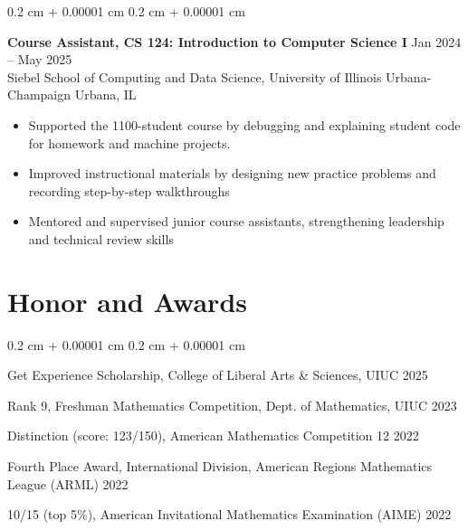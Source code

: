 \documentclass[10pt, letterpaper]{article}
\newenvironment{highlights}{
    \begin{itemize}[
        topsep=0 cm,
        parsep=0 cm,
        partopsep=0pt,
        itemsep=0pt,
        leftmargin=0.4 cm + 10pt
    ]
}{
    \end{itemize}
} %
\newenvironment{onecolentry}{
    \begin{adjustwidth}{
        0.2 cm + 0.00001 cm
    }{
        0.2 cm + 0.00001 cm
    }
}{
    \end{adjustwidth}
} %
\begin{document}
        \begin{onecolentry}
            \textbf{Course Assistant, CS 124: Introduction to Computer Science I} \hfill Jan 2024 -- May 2025 \\
            Siebel School of Computing and Data Science, University of Illinois Urbana-Champaign \hfill Urbana, IL
            
            \begin{highlights}
                \item Supported the 1100-student course by debugging and explaining student code for homework and machine projects.
                \item Improved instructional materials by designing new practice problems and recording step-by-step walkthroughs
                \item Mentored and supervised junior course assistants, strengthening leadership and technical review skills
            \end{highlights}
        \end{onecolentry}

        \vspace{0.2cm}
    
    \section{Honor and Awards}
        \begin{onecolentry}
            \begingroup \setlength{\parskip}{2.5pt} \vspace*{-\parskip}
                Get Experience Scholarship, College of Liberal Arts \& Sciences, UIUC \hfill 2025

                Rank 9, Freshman Mathematics Competition, Dept. of Mathematics, UIUC \hfill 2023

                Distinction (score: 123{\footnotesize /150}), American Mathematics Competition 12 \hfill 2022

                Fourth Place Award, International Division, American Regions Mathematics League (ARML) \hfill 2022



                10{\footnotesize /15} (top 5\%), American Invitational Mathematics Examination (AIME) \hfill 2022
            \endgroup
        \end{onecolentry}
\end{document}
